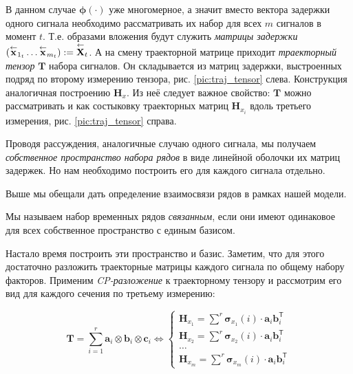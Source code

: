 	    	В данном случае $ \boldsymbol{\phi}(\cdot) $ уже многомерное, а значит вместо вектора задержки одного сигнала необходимо рассматривать их набор для всех $ m $ сигналов в момент $ t $. Т.е. образами вложения будут служить \emph{матрицы задержки} $ ( \overset{\leftarrow}{\mathbf{x}}_{1_t} \ldots \overset{\leftarrow}{\mathbf{x}}_{m_t} ) := \overset{\leftarrow}{\mathbf{X}}_{t} $. А на смену траекторной матрице приходит \textit{траекторный тензор} $ \mathbf{T} $ набора сигналов. Он складывается из матриц задержки, выстроенных подряд по второму измерению тензора, рис. \ref{pic:traj_tensor} слева. Конструкция аналогичная построению $ \mathbf{H}_x $. Из неё следует важное свойство: $ \mathbf{T} $ можно рассматривать и как состыковку траекторных матриц $ \mathbf{H}_{x_i} $ вдоль третьего измерения, рис. \ref{pic:traj_tensor} справа.
	    	
	    	Проводя рассуждения, аналогичные случаю одного сигнала, мы получаем \emph{собственное пространство набора рядов} в виде линейной оболочки их матриц задержек. Но нам необходимо построить его для каждого сигнала отдельно.
	    	
	    	Выше мы обещали дать определение взаимосвязи рядов в рамках нашей модели. 
	    	
	    	\begin{Def}
	    		Мы называем набор временных рядов \emph{связанным}, если они имеют одинаковое для всех собственное пространство с единым базисом.
	    	\end{Def}
	    	
	    	Настало время построить эти пространство и базис. Заметим, что для этого достаточно разложить траекторные матрицы каждого сигнала по общему набору факторов. Применим \textit{CP-разложение} к траекторному тензору и рассмотрим его вид для каждого сечения по третьему измерению:
	    	
	    	\begin{equation}\label{eq:tSSA_decomp}
	    		\mathbf{T} = \sum\limits_{i = 1}^{r} \mathbf{a}_i \otimes \mathbf{b}_i \otimes \mathbf{c}_i \Leftrightarrow \begin{cases}
	    			\mathbf{H}_{x_1} = \sum\limits^{r} \boldsymbol{\sigma}_{x_1}(i) \cdot \mathbf{a}_i  \mathbf{b}_i^{\mathsf{T}}  \\
	    			\mathbf{H}_{x_2} = \sum\limits^{r} \boldsymbol{\sigma}_{x_2}(i) \cdot \mathbf{a}_i  \mathbf{b}_i^{\mathsf{T}} \\
	    			\ldots \\
	    			\mathbf{H}_{x_m} = \sum\limits^{r} \boldsymbol{\sigma}_{x_m}(i) \cdot \mathbf{a}_i  \mathbf{b}_i^{\mathsf{T}} 
	    		\end{cases}
	    	\end{equation}
	    
